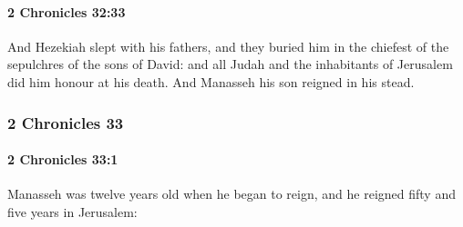 		\paragraph{2 Chronicles 32:33} %
			\label{2CHRONICLES-32-33}

			And Hezekiah slept with his fathers, and they buried him in the chiefest of the sepulchres of the sons of David: and all Judah and the inhabitants of Jerusalem did him honour at his death. And Manasseh his son reigned in his stead.

	\subsubsection{2 Chronicles 33} %
		\label{2CHRONICLES-33}

		\paragraph{2 Chronicles 33:1} %
			\label{2CHRONICLES-33-1}

			Manasseh was twelve years old when he began to reign, and he reigned fifty and five years in Jerusalem:

